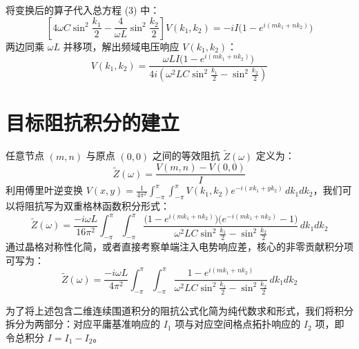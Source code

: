 \documentclass[11pt,a4paper]{ctexart}
\begin{document}
将变换后的算子代入总方程 (3) 中：
\begin{equation}
\left[ 4\omega C \sin^2\frac{k_1}{2} - \frac{4}{\omega L} \sin^2\frac{k_2}{2} \right] V(k_1, k_2) = -i I \big( 1 - e^{i(m k_1 + n k_2)} \big)
\end{equation}
两边同乘 $\omega L$ 并移项，解出频域电压响应 $V(k_1, k_2)$：
\begin{equation}
V(k_1, k_2) = \frac{\omega L I \big( 1 - e^{i(m k_1 + n k_2)} \big)}{4i \left( \omega^2 L C \sin^2\frac{k_1}{2} - \sin^2\frac{k_2}{2} \right)}
\end{equation}

\section{目标阻抗积分的建立}
任意节点 $(m,n)$ 与原点 $(0,0)$ 之间的等效阻抗 $\tilde{Z}(\omega)$ 定义为：
\begin{equation}
\tilde{Z}(\omega) = \frac{V(m,n) - V(0,0)}{I}
\end{equation}
利用傅里叶逆变换 $V(x,y) = \frac{1}{4\pi^2}\int_{-\pi}^{\pi}\int_{-\pi}^{\pi} V(k_1,k_2) e^{-i(xk_1+yk_2)} \,dk_1 dk_2$，我们可以将阻抗写为双重格林函数积分形式：
\begin{equation}
\tilde{Z}(\omega) = \frac{-i\omega L}{16\pi^2} \int_{-\pi}^{\pi} \int_{-\pi}^{\pi} \frac{\big(1 - e^{i(m k_1 + n k_2)}\big)\big(e^{-i(m k_1 + n k_2)} - 1\big)}{\omega^2 L C \sin^2\frac{k_1}{2} - \sin^2\frac{k_2}{2}} \, dk_1 dk_2
\end{equation}
通过晶格对称性化简，或者直接考察单端注入电势响应差，核心的非零贡献积分项可写为：
\begin{equation}
\tilde{Z}(\omega) = \frac{-i\omega L}{4\pi^2} \int_{-\pi}^{\pi} \int_{-\pi}^{\pi} \frac{1 - e^{i(m k_1 + n k_2)}}{\omega^2 L C \sin^2\frac{k_1}{2} - \sin^2\frac{k_2}{2}} \, dk_1 dk_2
\end{equation}




为了将上述包含二维连续围道积分的阻抗公式化简为纯代数求和形式，我们将积分拆分为两部分：对应平庸基准响应的 $I_1$ 项与对应空间格点拓扑响应的 $I_2$ 项，即令总积分 $I = I_1 - I_2$。
\end{document}
